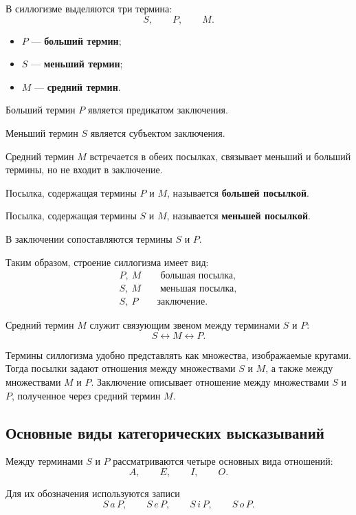 \documentclass[12pt,a4paper,oneside,openany]{book}
\theoremstyle{definition}
\theoremstyle{plain}
\theoremstyle{remark}
\begin{document}
В силлогизме выделяются три термина:
\[
S,\qquad P,\qquad M.
\]

\begin{itemize}
    \item \(P\) --- \textbf{больший термин};
    \item \(S\) --- \textbf{меньший термин};
    \item \(M\) --- \textbf{средний термин}.
\end{itemize}

Больший термин \(P\) является предикатом заключения.

Меньший термин \(S\) является субъектом заключения.

Средний термин \(M\) встречается в обеих посылках, связывает меньший
и больший термины, но не входит в заключение.

Посылка, содержащая термины \(P\) и \(M\), называется
\textbf{большей посылкой}.

Посылка, содержащая термины \(S\) и \(M\), называется
\textbf{меньшей посылкой}.

В заключении сопоставляются термины \(S\) и \(P\).

Таким образом, строение силлогизма имеет вид:
\[
\begin{array}{c}
P,\ M \qquad \text{большая посылка},\\
S,\ M \qquad \text{меньшая посылка},\\
\hline
S,\ P \qquad \text{заключение}.
\end{array}
\]

Средний термин \(M\) служит связующим звеном между терминами \(S\) и
\(P\):
\[
S
\longleftrightarrow
M
\longleftrightarrow
P.
\]

Термины силлогизма удобно представлять как множества, изображаемые
кругами. Тогда посылки задают отношения между множествами \(S\) и
\(M\), а также между множествами \(M\) и \(P\). Заключение описывает
отношение между множествами \(S\) и \(P\), полученное через средний
термин \(M\).

\subsection{Основные виды категорических высказываний}

Между терминами \(S\) и \(P\) рассматриваются четыре основных вида
отношений:
\[
A,\qquad E,\qquad I,\qquad O.
\]

Для их обозначения используются записи
\[
S\,a\,P,
\qquad
S\,e\,P,
\qquad
S\,i\,P,
\qquad
S\,o\,P.
\]
\end{document}
